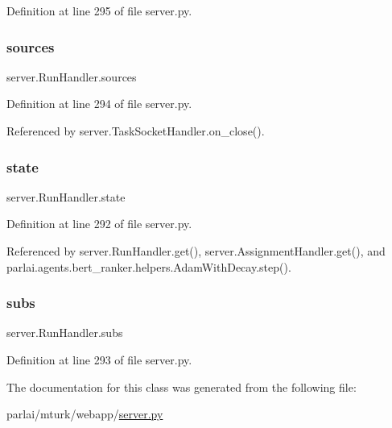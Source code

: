 Definition at line 295 of file server.\+py.

\mbox{\label{classserver_1_1RunHandler_a204368b0f478f5bb004084b79d3a5c38}} 
\subsubsection{\texorpdfstring{sources}{sources}}
{\footnotesize\ttfamily server.\+Run\+Handler.\+sources}



Definition at line 294 of file server.\+py.



Referenced by server.\+Task\+Socket\+Handler.\+on\+\_\+close().

\mbox{\label{classserver_1_1RunHandler_ad9dcf16819e0f4297aea0e6512d6a65c}} 
\subsubsection{\texorpdfstring{state}{state}}
{\footnotesize\ttfamily server.\+Run\+Handler.\+state}



Definition at line 292 of file server.\+py.



Referenced by server.\+Run\+Handler.\+get(), server.\+Assignment\+Handler.\+get(), and parlai.\+agents.\+bert\+\_\+ranker.\+helpers.\+Adam\+With\+Decay.\+step().

\mbox{\label{classserver_1_1RunHandler_aa4cf37384b9e744045ff194c8dd2ccbe}} 
\subsubsection{\texorpdfstring{subs}{subs}}
{\footnotesize\ttfamily server.\+Run\+Handler.\+subs}



Definition at line 293 of file server.\+py.



The documentation for this class was generated from the following file\+:\begin{DoxyCompactItemize}
\item 
parlai/mturk/webapp/\hyperlink{server_8py}{server.\+py}\end{DoxyCompactItemize}

